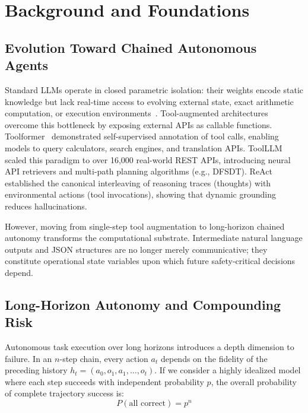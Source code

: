 \documentclass[conference]{IEEEtran}
\begin{document}
\section{Background and Foundations}
\subsection{Evolution Toward Chained Autonomous Agents}
Standard LLMs operate in closed parametric isolation: their weights encode static knowledge but lack real-time access to evolving external state, exact arithmetic computation, or execution environments~\cite{chowa2026from, mohammadi2025evaluation}. Tool-augmented architectures overcome this bottleneck by exposing external APIs as callable functions. Toolformer~\cite{schick2023toolformer} demonstrated self-supervised annotation of tool calls, enabling models to query calculators, search engines, and translation APIs. ToolLLM~\cite{qin2024toolllm} scaled this paradigm to over 16,000 real-world REST APIs, introducing neural API retrievers and multi-path planning algorithms (e.g., DFSDT). ReAct~\cite{yao2023react} established the canonical interleaving of reasoning traces (thoughts) with environmental actions (tool invocations), showing that dynamic grounding reduces hallucinations.

However, moving from single-step tool augmentation to long-horizon chained autonomy transforms the computational substrate. Intermediate natural language outputs and JSON structures are no longer merely communicative; they constitute operational state variables upon which future safety-critical decisions depend.

\subsection{Long-Horizon Autonomy and Compounding Risk}
Autonomous task execution over long horizons introduces a depth dimension to failure. In an $n$-step chain, every action $a_t$ depends on the fidelity of the preceding history $h_t = (a_0, o_1, a_1, \dots, o_t)$. If we consider a highly idealized model where each step succeeds with independent probability $p$, the overall probability of complete trajectory success is:
\begin{equation}
P(\text{all correct}) = p^n
\label{eq:independent_prob}
\end{equation}
\end{document}
